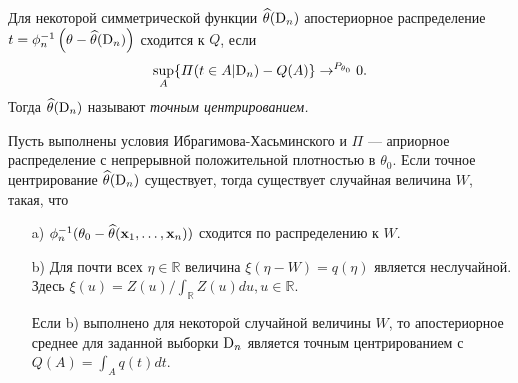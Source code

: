 \begin{Definition}
Для некоторой симметрической функции $\widehat{\theta}(\mathrm{D}_{n})$ апостериорное распределение $t = \phi_{n}^{-1} \left(\theta - \widehat{\theta}(\mathrm{D}_{n}) \right)$ сходится к $Q$, если 
\[
\sup_{A} \{\varPi(t \in A| \mathrm{D}_{n}) - Q(A)\} \rightarrow^{P_{\theta_0}} 0.
\]
Тогда $\widehat{\theta}(\mathrm{D}_{n})$ называют \emph{точным центрированием.}
\end{Definition}

\begin{Theorem}
Пусть выполнены условия Ибрагимова-Хасьминского и $\Pi$ --- априорное распределение с непрерывной положительной плотностью в $\theta_0$. 
Если точное центрирование $\widehat{\theta}(\mathrm{D}_{n})$ существует, тогда существует случайная величина $W\!$, такая, что
\begin{itemize}
\item[a)] $\phi_{n}^{-1}(\theta_0 - \widehat{\theta}(\mathbf{x}_1, \ldots, \mathbf{x}_{n}))$ сходится по распределению к $W$.
\item[b)] Для почти всех $\eta \in \mathbb{R}$ величина $\xi(\eta - W) = q(\eta)$ является неслучайной. Здесь $\xi(u) = Z(u) / \int_{\mathbb{R}} Z(u) du, u \in \mathbb{R}$.

Если b) выполнено для некоторой случайной величины $W$, то апостериорное среднее для заданной выборки $\mathrm{D}_n$ является точным центрированием с $Q(A) = \int_{A} q(t) dt$.
\end{itemize}
\end{Theorem}
